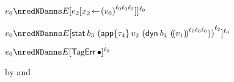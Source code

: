 {\begin{lamportproof*}
    \begin{pfproof}
        \begin{pfproof}
          \qedstep
            \begin{pfproof}
              \(\sexpr_0 \nredNDanns \ctx\ctxbars{\esubst{\sexpr_2}{\svar_2}{\obars{\svalue_0}{\fconcat{\sowner_0}{\fconcat{\sowner_0}{\sowner_0}}}}}{\sowner_0}\)
            \end{pfproof}
        \end{pfproof}
        \begin{pfproof}
          \qedstep
            \begin{pfproof}
              \(\sexpr_0 \nredNDanns
                \ctx\ctxbars{\estab{\sbnd_3}{\obars{\eapp{{\stype_4}}{\svalue_2}{(\edynb{\sbnd_4}{\obbars{\svalue_1}{\fconcat{\sowner_0}{\fconcat{\sowner_0}{\sowner_0}}}})}}{\sowner_2}}}{\sowner_0}
              \)
            \end{pfproof}
        \end{pfproof}
        \begin{pfproof}
          \qedstep
            \begin{pfproof}
              $\sexpr_0 \nredNDanns \ctx\ctxbars{\tagerrorD}{\sowner_0}$
            \end{pfproof}
        \end{pfproof}
    \end{pfproof}

    \begin{pfproof}
      \qedstep
        \begin{pfproof}
          by  and 
        \end{pfproof}
    \end{pfproof}


\end{lamportproof*}}
